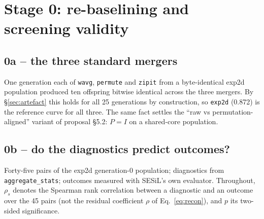 \documentclass[11pt,a4paper]{article}
\newcommand{\code}[1]{\texttt{#1}}
\begin{document}
\section{Stage 0: re-baselining and screening validity}

\subsection{0a -- the three standard mergers}
One generation each of \code{wavg}, \code{permute} and \code{zipit} from a byte-identical exp2d population produced ten offspring bitwise identical across the three mergers. By \S\ref{sec:artefact} this holds for all 25 generations by construction, so \code{exp2d} (0.872) is the reference curve for all three. The same fact settles the ``raw vs permutation-aligned'' variant of proposal \S5.2: $P=I$ on a shared-core population.

\subsection{0b -- do the diagnostics predict outcomes?}
Forty-five pairs of the exp2d generation-0 population; diagnostics from \code{aggregate\_stats}; outcomes measured with SESiL's own evaluator. Throughout, $\rho_s$ denotes the Spearman rank correlation between a diagnostic and an outcome over the 45 pairs (not the residual coefficient $\rho$ of Eq.~\ref{eq:recon}), and $p$ its two-sided significance.
\end{document}

